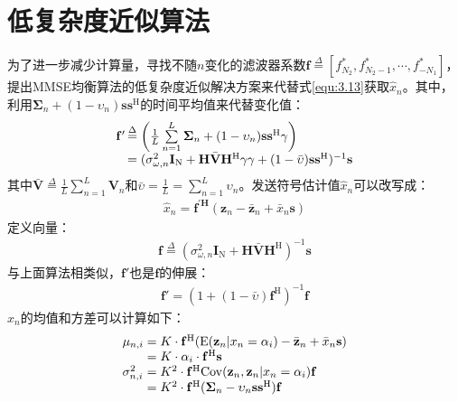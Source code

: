 \section{低复杂度近似算法}
为了进一步减少计算量，寻找不随$n$变化的滤波器系数$\mathbf{f}\overset{\Delta}{=}[f_{N_2}^*,f_{N_2-1}^*,\cdots,f_{-N_1}^*]$，提出MMSE均衡算法的低复杂度近似解决方案来代替式\ref{equ:3.13}获取$\hat{x}_n$。其中，利用$\boldsymbol{\Sigma}_n+(1-\upsilon_n)\mathbf{s}\mathbf{s}^{\mathrm{H}}$的时间平均值来代替变化值：
\begin{eqnarray}
    \begin{array}{l@{\,}l}
        {\mathbf{f}}'&\overset{\Delta}{=}\left(\frac{1}{L}\sum\limits_{n=1}^{L}\boldsymbol{\Sigma}_n+(1-\upsilon_n)\mathbf{s}\mathbf{s}^{\mathrm{H}}\gamma\right)\\
        &=(\sigma_{\omega,n}^2\mathbf{I}_{\mathrm{N}}+\mathbf{H}\bar{\mathbf{V}}\mathbf{H}^{\mathrm{H}}\gamma\gamma+(1-\bar{\upsilon})\mathbf{s}\mathbf{s}^{\mathrm{H}})^{-1}\mathbf{s}
    \end{array}
    \label{equ:3.30}
\end{eqnarray}
其中$\bar{\mathbf{V}}\overset{\Delta}{=}\frac{1}{L}\sum_{n=1}^L\mathbf{V}_n$和$\bar{\upsilon}=\frac{1}{L}=\sum_{n=1}^L\upsilon_n$。发送符号估计值$\hat{x}_n$可以改写成：
\begin{eqnarray}
    \hat{x}_n=\mathbf{f}^{'\mathbf{H}}(\mathbf{z}_n-\bar{\mathbf{z}}_n+\bar{x}_n\mathbf{s})
    \label{equ:3.31}
\end{eqnarray}
定义向量：
\begin{eqnarray}
    \mathbf{f}\overset{\Delta}{=}(\sigma_{\omega,n}^2\mathbf{I}_{\mathrm{N}}+\mathbf{H}\bar{\mathbf{V}}\mathbf{H}^{\mathrm{H}})^{-1}\mathbf{s}
    \label{equ:3.32}
\end{eqnarray}
与上面算法相类似，${\mathbf{f}}'$也是$\mathbf{f}$的伸展：
\begin{eqnarray}
    {\mathbf{f}}'=(1+(1-\bar{\upsilon})\mathbf{f}^{\mathrm{H}})^{-1}\mathbf{f}
    \label{equ:3.33}
\end{eqnarray}
$\hat{x}_n$的均值和方差可以计算如下：
\begin{eqnarray}
    \begin{array}{l@{\;=\;}l}
        \mu_{n,i}&K\cdot\mathbf{f}^{\mathrm{H}}(\mathrm{E}(\mathbf{z}_n|x_n=\alpha_i)-\bar{\mathbf{z}}_n+\bar{x}_n\mathbf{s})\\
        &K\cdot\alpha_i\cdot\mathbf{f}^{\mathrm{H}}\mathbf{s}\\
        \sigma_{n,i}^2&K^2\cdot\mathbf{f}^{\mathrm{H}}\mathrm{Cov}(\mathbf{z}_n,\mathbf{z}_n|x_n=\alpha_i)\mathbf{f}\\
        &K^2\cdot\mathbf{f}^{\mathrm{H}}(\boldsymbol{\Sigma}_n-\upsilon_n\mathbf{s}\mathbf{s}^{\mathrm{H}})\mathbf{f}
    \end{array}
    \label{equ:3.34}
\end{eqnarray}

